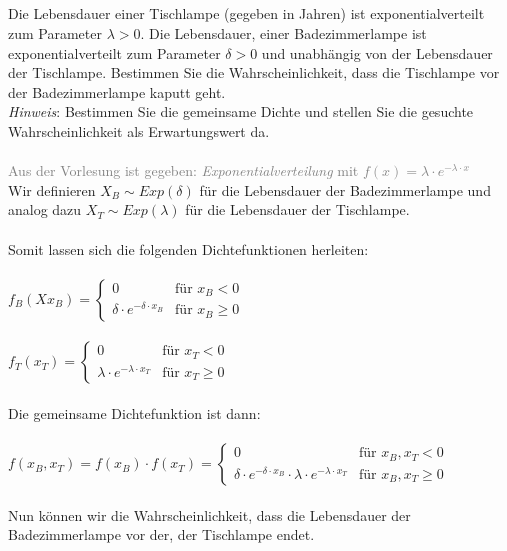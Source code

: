 \documentclass[a4paper]{article}
\begin{document}
\subsection{}
Die Lebensdauer einer Tischlampe (gegeben in Jahren) ist exponentialverteilt zum Parameter $\lambda > 0$. Die Lebensdauer, einer Badezimmerlampe ist exponentialverteilt zum Parameter $\delta > 0$ und unabhängig von der Lebensdauer der Tischlampe. Bestimmen Sie die Wahrscheinlichkeit, dass die Tischlampe vor der Badezimmerlampe kaputt geht.\\
\textit{Hinweis}: Bestimmen Sie die gemeinsame Dichte und stellen Sie die gesuchte Wahrscheinlichkeit als Erwartungswert da.\\\\
\textcolor{gray}{Aus der Vorlesung ist gegeben: \textit{Exponentialverteilung} mit $f(x) = \lambda \cdot e^{- \lambda \cdot x}$}\\
Wir definieren $X_B \sim Exp(\delta)$ für die Lebensdauer der Badezimmerlampe und analog dazu $X_T \sim Exp(\lambda)$ für die Lebensdauer der Tischlampe.\\\\
Somit lassen sich die folgenden Dichtefunktionen herleiten:\\\\
\(f_B(Xx_B) = \begin{cases}
    0 & \text{für } x_B < 0\\
    \delta \cdot e^{- \delta \cdot x_B} & \text{für } x_B \geq 0
\end{cases}\)\\\\
\(f_T(x_T) = \begin{cases}
    0 & \text{für } x_T < 0\\
    \lambda \cdot e^{- \lambda \cdot x_T} & \text{für } x_T \geq 0
\end{cases}\)\\\\
Die gemeinsame Dichtefunktion ist dann:\\\\
\(f(x_B, x_T) = f(x_B) \cdot f(x_T) = \begin{cases}
    0 & \text{für } x_B, x_T < 0\\
    \delta \cdot e^{- \delta \cdot x_B} \cdot \lambda \cdot e^{- \lambda \cdot x_T} & \text{für } x_B, x_T \geq 0
\end{cases}\)\\\\
Nun können wir die Wahrscheinlichkeit, dass die Lebensdauer der Badezimmerlampe vor der, der Tischlampe endet.\\\\
\end{document}
